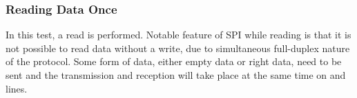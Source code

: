 
\newpage
\subsubsection{Reading Data Once}
In this test, a read is performed. Notable feature of SPI while reading is that it is not possible to read data without a write, due to simultaneous full-duplex nature of the protocol. Some form of data, either empty data or right data, need to be sent and the transmission and reception will take place at the same time on  and  lines.

